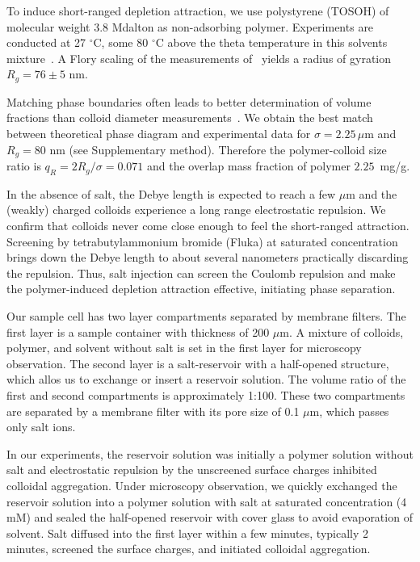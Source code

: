 \documentclass[preprint,amsmath,amssymb,superscriptaddress]{revtex4-1}
\begin{document}
To induce short-ranged depletion attraction, we use polystyrene (TOSOH) of molecular weight 3.8 Mdalton as non-adsorbing polymer.
Experiments are conducted at 27 $^\circ$C, some 80 $^\circ$C above the theta temperature in this solvents mixture~\cite{Royall2007}. A Flory scaling of the measurements of~\cite{lu2008gelation} yields a radius of gyration $R_g=76\pm5$ nm.

Matching phase boundaries often leads to better determination of volume fractions than colloid diameter measurements~\cite{Poon2012}. We obtain the best match between theoretical phase diagram and experimental data for $\sigma=2.25\,\mu$m and $R_g=80$ nm (see Supplementary method). Therefore the polymer-colloid size ratio is $q_R=2R_g/\sigma=0.071$ and the overlap mass fraction of polymer $2.25$~mg/g.

In the absence of salt, the Debye length is expected to reach a few $\mu$m and the (weakly) charged colloids experience a long range electrostatic repulsion. We confirm that colloids never come close enough to feel the short-ranged attraction. Screening by tetrabutylammonium bromide (Fluka) at saturated concentration brings down the Debye length to about several nanometers practically discarding the repulsion. 
Thus, salt injection can screen the Coulomb repulsion and make the polymer-induced depletion attraction effective, initiating phase separation. 

Our sample cell has two layer compartments separated by membrane filters. The first layer is a sample container with thickness of 200 $\mu$m. A mixture of colloids, polymer, and solvent without salt is  set in the first layer for microscopy observation. The second layer is a salt-reservoir with a half-opened structure, which allos us to exchange or insert a reservoir solution. The volume ratio of the first and second compartments is approximately 1:100. These two compartments are separated by a membrane filter with its pore size of 0.1 $\mu$m, which passes only salt ions. 

In our experiments, the reservoir solution was initially a polymer solution without salt and electrostatic repulsion by the unscreened surface charges inhibited colloidal aggregation. Under microscopy observation, we quickly exchanged the reservoir solution into a polymer solution with salt at saturated concentration (4 mM) and sealed the half-opened reservoir with cover glass to avoid evaporation of solvent. Salt diffused into the first layer within a few minutes, typically 2 minutes, screened the surface charges, and initiated colloidal aggregation. 
\end{document}
